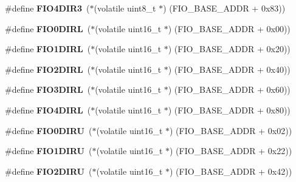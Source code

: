 \begin{DoxyCompactItemize}
\#define {\bfseries F\+I\+O4\+D\+I\+R3}~($\ast$(volatile uint8\+\_\+t $\ast$) (F\+I\+O\+\_\+\+B\+A\+S\+E\+\_\+\+A\+D\+DR + 0x83))
\item 
\mbox{\label{group__lpc24xx__regs_gae46f211e46ed9a330348610e6f701f5d}} 
\#define {\bfseries F\+I\+O0\+D\+I\+RL}~($\ast$(volatile uint16\+\_\+t $\ast$) (F\+I\+O\+\_\+\+B\+A\+S\+E\+\_\+\+A\+D\+DR + 0x00))
\item 
\mbox{\label{group__lpc24xx__regs_ga11c9b313fe29cafb60b35be032da8258}} 
\#define {\bfseries F\+I\+O1\+D\+I\+RL}~($\ast$(volatile uint16\+\_\+t $\ast$) (F\+I\+O\+\_\+\+B\+A\+S\+E\+\_\+\+A\+D\+DR + 0x20))
\item 
\mbox{\label{group__lpc24xx__regs_ga30dfe33bb4f437db23a506fa25c8b6a2}} 
\#define {\bfseries F\+I\+O2\+D\+I\+RL}~($\ast$(volatile uint16\+\_\+t $\ast$) (F\+I\+O\+\_\+\+B\+A\+S\+E\+\_\+\+A\+D\+DR + 0x40))
\item 
\mbox{\label{group__lpc24xx__regs_ga2c0860fd431e8f93de0789cb5d8c0031}} 
\#define {\bfseries F\+I\+O3\+D\+I\+RL}~($\ast$(volatile uint16\+\_\+t $\ast$) (F\+I\+O\+\_\+\+B\+A\+S\+E\+\_\+\+A\+D\+DR + 0x60))
\item 
\mbox{\label{group__lpc24xx__regs_gab8f76a61eae7f51bec492981fd9cd538}} 
\#define {\bfseries F\+I\+O4\+D\+I\+RL}~($\ast$(volatile uint16\+\_\+t $\ast$) (F\+I\+O\+\_\+\+B\+A\+S\+E\+\_\+\+A\+D\+DR + 0x80))
\item 
\mbox{\label{group__lpc24xx__regs_ga5ab399175bcc80582dee4c2ade4692b4}} 
\#define {\bfseries F\+I\+O0\+D\+I\+RU}~($\ast$(volatile uint16\+\_\+t $\ast$) (F\+I\+O\+\_\+\+B\+A\+S\+E\+\_\+\+A\+D\+DR + 0x02))
\item 
\mbox{\label{group__lpc24xx__regs_ga8fe45ace67d60ccfaa65df5efc476ab4}} 
\#define {\bfseries F\+I\+O1\+D\+I\+RU}~($\ast$(volatile uint16\+\_\+t $\ast$) (F\+I\+O\+\_\+\+B\+A\+S\+E\+\_\+\+A\+D\+DR + 0x22))
\item 
\mbox{\label{group__lpc24xx__regs_ga4ee4e0d9bb8165572c77a3378bffd977}} 
\#define {\bfseries F\+I\+O2\+D\+I\+RU}~($\ast$(volatile uint16\+\_\+t $\ast$) (F\+I\+O\+\_\+\+B\+A\+S\+E\+\_\+\+A\+D\+DR + 0x42))

\end{DoxyCompactItemize}
